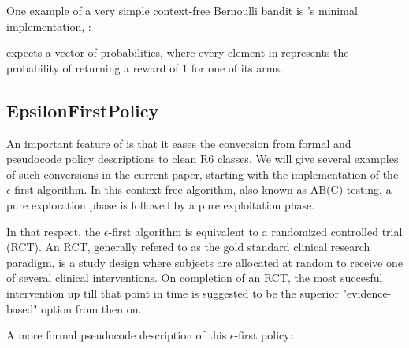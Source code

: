 \documentclass{jss}
\begin{document}
One example of a very simple context-free Bernoulli bandit is 's minimal  implementation, :


 expects a  vector of probabilities, where every element in  represents the probability of  returning a reward of $1$ for one of its  arms.

\subsection{EpsilonFirstPolicy} \label{epsfirst}

An important feature of  is that it eases the conversion from formal and pseudocode policy descriptions to clean R6 classes. We will give several examples of such conversions in the current paper, starting with the implementation of the $\epsilon$-first algorithm. In this context-free algorithm, also known as AB(C) testing, a pure exploration phase is followed by a pure exploitation phase.

In that respect, the $\epsilon$-first algorithm is equivalent to a randomized controlled trial (RCT). An RCT, generally refered to as the gold standard clinical research paradigm, is a study design where subjects are allocated at random to receive one of several clinical interventions. On completion of an RCT, the most succesful intervention up till that point in time is suggested to be the superior "evidence-based" option from then on.

A more formal pseudocode description of this $\epsilon$-first policy:
\end{document}
